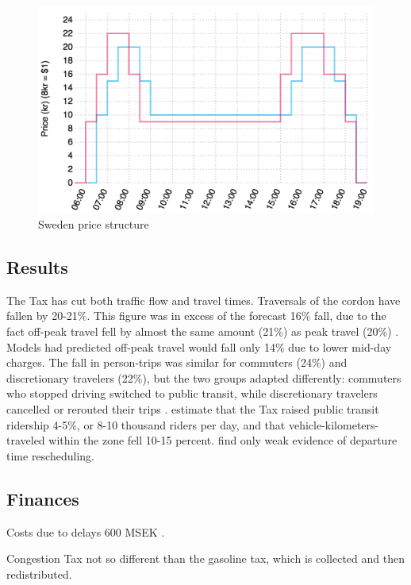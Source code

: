 \begin{figure}
\includegraphics[width=5in]{../img/sweden-prices.png}
\caption{Sweden price structure \citep{transportstyrelsen2015}}
\label{fig:sweden-schedules}
\end{figure}

\subsection{Results}

The Tax has cut both traffic flow and travel times. Traversals of the cordon have fallen by 20-21\%. This figure was in excess of the forecast 16\% fall, due to the fact off-peak travel fell by almost the same amount (21\%) as peak travel (20\%) \citep{Eliasson2013}. Models had predicted off-peak travel would fall only 14\% due to lower mid-day charges. The fall in person-trips was similar for commuters (24\%) and discretionary travelers (22\%), but the two groups adapted differently: commuters who stopped driving switched to public transit, while discretionary travelers cancelled or rerouted their trips \citep{FranklinEtAl2010}. \citet{Eliasson2013} estimate that the Tax raised public transit ridership 4-5\%, or 8-10 thousand riders per day, and that vehicle-kilometers-traveled within the zone fell 10-15 percent. \citet{Karlstrom2009} find only weak evidence of departure time rescheduling.

\subsection{Finances}
Costs due to delays 600 MSEK \citet[p. 843]{GullbergIsaksson2009}.

Congestion Tax not so different than the gasoline tax, which is collected and then redistributed.